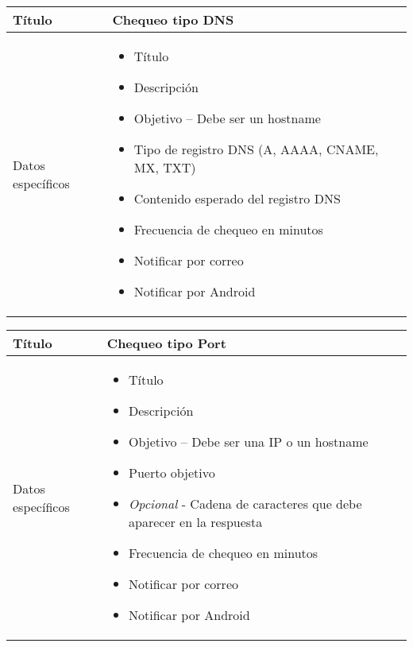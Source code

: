 \begin{center}
  
  \begin{tabularx}{\textwidth}{|l|X|}
    \hline

    Título & Chequeo tipo DNS \\

    \hline
    Datos específicos &

    \begin{itemize}
      \item Título 
      \item Descripción
      \item Objetivo -- Debe ser un hostname
      \item Tipo de registro DNS (A, AAAA, CNAME, MX, TXT)
      \item Contenido esperado del registro DNS
      \item Frecuencia de chequeo en minutos
      \item Notificar por correo
      \item Notificar por Android
    \end{itemize}
    \\
    
    \hline
    
  \end{tabularx}
\end{center}

\begin{center}
  
  \begin{tabularx}{\textwidth}{|l|X|}
    \hline

    Título & Chequeo tipo Port \\

    \hline
    Datos específicos &

    \begin{itemize}
      \item Título 
      \item Descripción
      \item Objetivo -- Debe ser una IP o un hostname
      \item Puerto objetivo
      \item \textit{Opcional} - Cadena de caracteres que debe aparecer en la respuesta
      \item Frecuencia de chequeo en minutos
      \item Notificar por correo
      \item Notificar por Android
    \end{itemize}
    \\
    
    \hline
    
  \end{tabularx}
\end{center}

